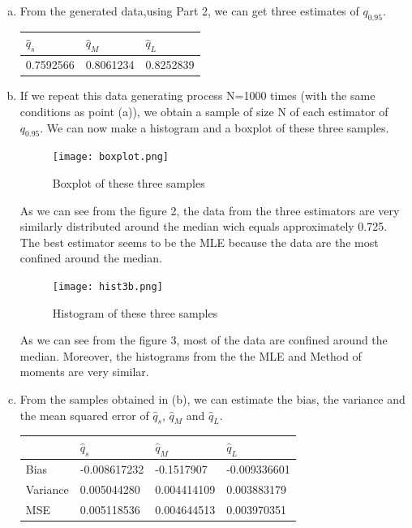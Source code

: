 \documentclass[a4paper]{article}
\begin{document}
\begin{enumerate}[(a)]

\item From the generated data,using Part 2, we can get three estimates of $q_{0.95}$.
\\

\begin{center}
    \begin{tabular}{ | l | l | l | }
    \hline
      $\hat{q}_s$ & $\hat{q}_M$ & $\hat{q}_L$
     \\ \hline
     0.7592566 & 0.8061234 & 0.8252839 \\ \hline
    \end{tabular}
\end{center}

\item If we repeat this data generating process N=1000 times (with the same conditions as point (a)), we obtain a sample of size N of  each estimator of $q_{0.95}$. We can now make a histogram and a boxplot of these three samples. 

\begin{figure}[!h]
    \centering
  \texttt{[image: boxplot.png]}
  \caption{Boxplot of these three samples}
\end{figure}

As we can see from the figure 2, the data  from the three estimators are very similarly distributed around the median wich equals approximately 0.725. The best estimator seems to be the MLE because the data are the most confined around the median.

\begin{figure}[!h]
    \centering
  \texttt{[image: hist3b.png]}
  \caption{Histogram of these three samples}
\end{figure}

As we can see from the figure 3, most of the data are confined around the median. Moreover, the histograms from the the MLE and Method of moments are very similar. 

\item From the samples obtained in (b), we can estimate the bias, the variance and the mean squared error of $\hat{q}_s$, $\hat{q}_M$ and $\hat{q}_L$. 

\begin{center}
    \begin{tabular}{ | l | l | l | l |}
    \hline
     & $\hat{q}_s$ & $\hat{q}_M$ & $\hat{q}_L$
     \\ \hline
    Bias & -0.008617232 & -0.1517907 & -0.009336601 \\ \hline
    Variance & 0.005044280 & 0.004414109 & 0.003883179 \\ \hline
    MSE & 0.005118536 & 0.004644513 & 0.003970351
 \\
    \hline
    \end{tabular}
\end{center}


\end{enumerate}
\end{document}
